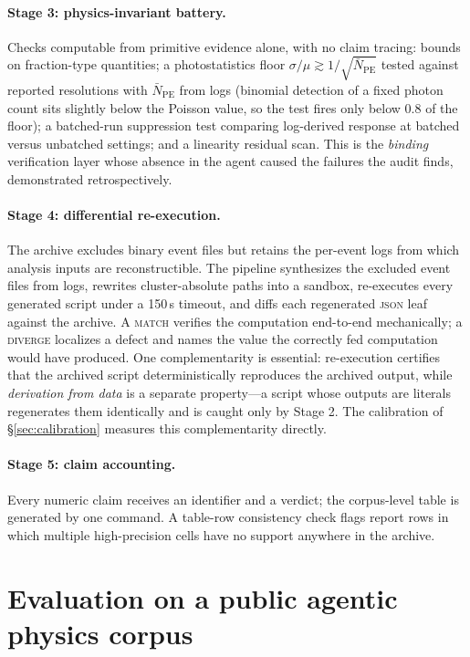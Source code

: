 \documentclass{article}
\begin{document}
\paragraph{Stage 3: physics-invariant battery.} Checks computable from primitive evidence alone, with no claim tracing: bounds on fraction-type quantities; a photostatistics floor $\sigma/\mu \gtrsim 1/\sqrt{\bar N_{\mathrm{PE}}}$ tested against reported resolutions with $\bar N_{\mathrm{PE}}$ from logs (binomial detection of a fixed photon count sits slightly below the Poisson value, so the test fires only below $0.8$ of the floor); a batched-run suppression test comparing log-derived response at batched versus unbatched settings; and a linearity residual scan. This is the \emph{binding} verification layer whose absence in the agent caused the failures the audit finds, demonstrated retrospectively.

\paragraph{Stage 4: differential re-execution.} The archive excludes binary event files but retains the per-event logs from which analysis inputs are reconstructible. The pipeline synthesizes the excluded event files from logs, rewrites cluster-absolute paths into a sandbox, re-executes every generated script under a 150\,s timeout, and diffs each regenerated \textsc{json} leaf against the archive. A \textsc{match} verifies the computation end-to-end mechanically; a \textsc{diverge} localizes a defect and names the value the correctly fed computation would have produced. One complementarity is essential: re-execution certifies that the archived script deterministically reproduces the archived output, while \emph{derivation from data} is a separate property---a script whose outputs are literals regenerates them identically and is caught only by Stage 2. The calibration of \S\ref{sec:calibration} measures this complementarity directly.

\paragraph{Stage 5: claim accounting.} Every numeric claim receives an identifier and a verdict; the corpus-level table is generated by one command. A table-row consistency check flags report rows in which multiple high-precision cells have no support anywhere in the archive.

\section{Evaluation on a public agentic physics corpus}
\label{sec:eval}
\end{document}
